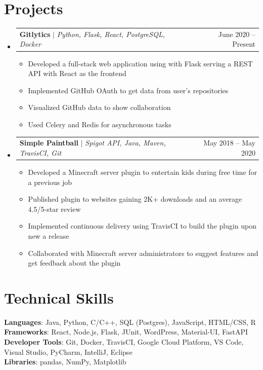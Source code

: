 \documentclass[letterpaper,11pt]{article}
\makeatletter
\newcommand{\resumeItem}[1]{
  \item\small{
    {#1 \vspace{-2pt}}
  }
}
\newcommand{\resumeProjectHeading}[2]{
    \item
    \begin{tabular*}{0.97\textwidth}{l@{\extracolsep{\fill}}r}
      \small#1 & #2 \\
    \end{tabular*}\vspace{-7pt}
}
\newcommand{\resumeSubHeadingListStart}{\begin{itemize}[leftmargin=0.15in, label={}]}
\newcommand{\resumeSubHeadingListEnd}{\end{itemize}}
\newcommand{\resumeItemListStart}{\begin{itemize}}
\newcommand{\resumeItemListEnd}{\end{itemize}\vspace{-5pt}}
\makeatother
\begin{document}
\section{Projects}
\resumeSubHeadingListStart
\resumeProjectHeading
{\textbf{Gitlytics} $|$ \emph{Python, Flask, React, PostgreSQL, Docker}}{June 2020 -- Present}
\resumeItemListStart
\resumeItem{Developed a full-stack web application using with Flask serving a REST API with React as the frontend}
\resumeItem{Implemented GitHub OAuth to get data from user’s repositories}
\resumeItem{Visualized GitHub data to show collaboration}
\resumeItem{Used Celery and Redis for asynchronous tasks}
\resumeItemListEnd
\resumeProjectHeading
{\textbf{Simple Paintball} $|$ \emph{Spigot API, Java, Maven, TravisCI, Git}}{May 2018 -- May 2020}
\resumeItemListStart
\resumeItem{Developed a Minecraft server plugin to entertain kids during free time for a previous job}
\resumeItem{Published plugin to websites gaining 2K+ downloads and an average 4.5/5-star review}
\resumeItem{Implemented continuous delivery using TravisCI to build the plugin upon new a release}
\resumeItem{Collaborated with Minecraft server administrators to suggest features and get feedback about the plugin}
\resumeItemListEnd
\resumeSubHeadingListEnd



%
\section{Technical Skills}
\begin{itemize}[leftmargin=0.15in, label={}]
  \small{\item{
        \textbf{Languages}{: Java, Python, C/C++, SQL (Postgres), JavaScript, HTML/CSS, R} \\
        \textbf{Frameworks}{: React, Node.js, Flask, JUnit, WordPress, Material-UI, FastAPI} \\
        \textbf{Developer Tools}{: Git, Docker, TravisCI, Google Cloud Platform, VS Code, Visual Studio, PyCharm, IntelliJ, Eclipse} \\
        \textbf{Libraries}{: pandas, NumPy, Matplotlib}
        }}
\end{itemize}


\end{document}
